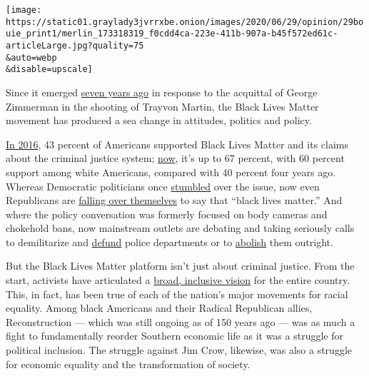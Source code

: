 \texttt{[image: https://static01.graylady3jvrrxbe.onion/images/2020/06/29/opinion/29bouie\_print1/merlin\_173318319\_f0cdd4ca-223e-411b-907a-b45f572ed61c-articleLarge.jpg?quality=75\\\&auto=webp\\\&disable=upscale]}

Since it emerged \href{https://blacklivesmatter.com/herstory/}{seven
years ago} in response to the acquittal of George Zimmerman in the
shooting of Trayvon Martin, the Black Lives Matter movement has produced
a sea change in attitudes, politics and policy.

\href{https://www.pewresearch.org/fact-tank/2016/07/08/how-americans-view-the-black-lives-matter-movement/}{In
2016}, 43 percent of Americans supported Black Lives Matter and its
claims about the criminal justice system;
\href{https://www.pewsocialtrends.org/2020/06/12/amid-protests-majorities-across-racial-and-ethnic-groups-express-support-for-the-black-lives-matter-movement/}{now},
it's up to 67 percent, with 60 percent support among white Americans,
compared with 40 percent four years ago. Whereas Democratic politicians
once
\href{https://www.npr.org/sections/itsallpolitics/2015/07/31/427851451/democratic-candidates-stumble-over-black-lives-matter-movement}{stumbled}
over the issue, now even Republicans are
\href{https://www.theatlantic.com/politics/archive/2020/06/mitt-romney-black-lives-matter/612808/}{falling
over themselves} to say that ``black lives matter.'' And where the
policy conversation was formerly focused on body cameras and chokehold
bans, now mainstream outlets are debating and taking seriously calls to
demilitarize and
\href{https://www.brookings.edu/blog/fixgov/2020/06/19/what-does-defund-the-police-mean-and-does-it-have-merit/}{defund}
police departments or to
\href{https://www.nytimes3xbfgragh.onion/2020/06/12/opinion/sunday/floyd-abolish-defund-police.html}{abolish}
them outright.

But the Black Lives Matter platform isn't just about criminal justice.
From the start, activists have articulated a
\href{https://m4bl.org/policy-platforms/}{broad, inclusive vision} for
the entire country. This, in fact, has been true of each of the nation's
major movements for racial equality. Among black Americans and their
Radical Republican allies, Reconstruction --- which was still ongoing as
of 150 years ago --- was as much a fight to fundamentally reorder
Southern economic life as it was a struggle for political inclusion. The
struggle against Jim Crow, likewise, was also a struggle for economic
equality and the transformation of society.

